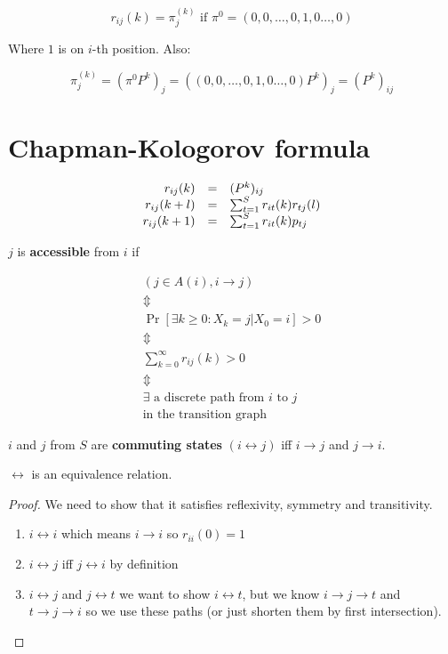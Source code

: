 \begin{observ}
	$$
	r_{ij}(k) = \pi_{j}^{(k)} \text{ if } \pi^{0} = \left( 0, 0, \dots, 0, 1, 0 \dots, 0\right)
	$$
	
	Where $1$ is on $i$-th position. Also:
	
	$$
	\pi_{j}^{(k)} = (\pi^{0} P^{k})_{j} = \left( \left( 0, 0, \dots, 0, 1, 0 \dots, 0\right)P^{k}\right)_{j} = (P^{k})_{ij}
	$$
\end{observ}

\section{Chapman-Kologorov formula}

$$
\begin{array}{r c l}
	r_{ij}(k) & = & (P^{k})_{ij} \\
	r_{ij}(k+l) & = & \sum_{t=1}^{S} r_{it}(k)r_{tj}(l) \\
	r_{ij}(k+1) & = & \sum_{t=1}^{S} r_{it}(k) p_{tj}
\end{array}
$$

\begin{defn}
	$j$ is \textbf{accessible} from $i$ if
	
	$$
	\begin{array}{c}
		(j \in A(i), i \to j) \\
		\Updownarrow \\
		\Pr[\exists k \geq 0 : X_{k} = j \vert X_{0} = i] > 0 \\
		\Updownarrow \\
		\sum_{k=0}^{\infty} r_{ij}(k) > 0 \\
		\Updownarrow \\
		\exists \text{ a discrete path from } i \text{ to } j \\
		\text{in the transition graph}
	\end{array}
	$$
\end{defn}

\begin{defn}
	$i$ and $j$ from $S$ are \textbf{commuting states} $(i \leftrightarrow j)$ iff $i \to j$ and $j \to i$.
\end{defn}

\begin{lemma}
	$\leftrightarrow$ is an equivalence relation.
\end{lemma}

\begin{proof}
	We need to show that it satisfies reflexivity, symmetry and transitivity.
	
	\begin{enumerate}
		\item $i \leftrightarrow i$ which means $i \to i$ so $r_{ii}(0) =1$
		\item $i \leftrightarrow j$ iff $j \leftrightarrow i$ by definition
		\item $i \leftrightarrow j$ and $j \leftrightarrow t$ we want to show $i \leftrightarrow t$, but we know $i \to j \to t$ and $t \to j \to i$ so we use these paths (or just shorten them by first intersection).
	\end{enumerate}
\end{proof}

